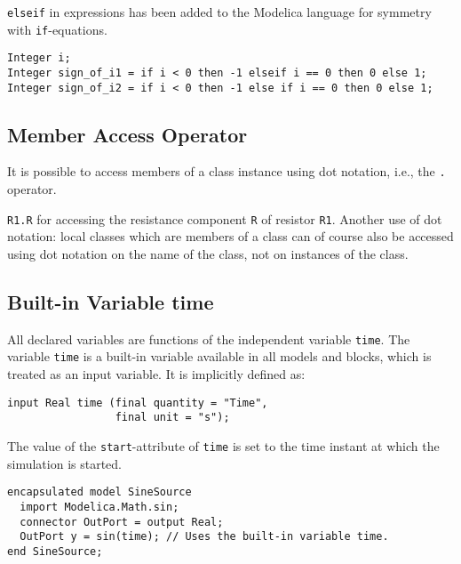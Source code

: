 \begin{nonnormative}
\lstinline!elseif! in expressions has been added to the Modelica language for symmetry with \lstinline!if!-equations.
\end{nonnormative}

\begin{example}
\begin{lstlisting}[language=modelica]
Integer i;
Integer sign_of_i1 = if i < 0 then -1 elseif i == 0 then 0 else 1;
Integer sign_of_i2 = if i < 0 then -1 else if i == 0 then 0 else 1;
\end{lstlisting}
\end{example}

\subsection{Member Access Operator}\label{member-access-operator}

It is possible to access members of a class instance using dot notation, i.e., the \lstinline!.! operator.

\begin{example}
\lstinline!R1.R! for accessing the resistance component \lstinline!R! of resistor \lstinline!R1!.
Another use of dot notation: local classes which are members of a class can of course also be accessed using dot notation on the name of the class, not on instances of the class.
\end{example}

\subsection{Built-in Variable time}\label{built-in-variable-time}

All declared variables are functions of the independent variable \lstinline!time!.
The variable \lstinline!time! is a built-in variable available in all models and blocks, which is treated as an input variable.
It is implicitly defined as:
\begin{lstlisting}[language=modelica]
input Real time (final quantity = "Time",
                 final unit = "s");
\end{lstlisting}

The value of the \lstinline!start!-attribute of \lstinline!time! is set to the time instant at which the simulation is started.

\begin{example}
\begin{lstlisting}[language=modelica]
encapsulated model SineSource
  import Modelica.Math.sin;
  connector OutPort = output Real;
  OutPort y = sin(time); // Uses the built-in variable time.
end SineSource;
\end{lstlisting}
\end{example}

